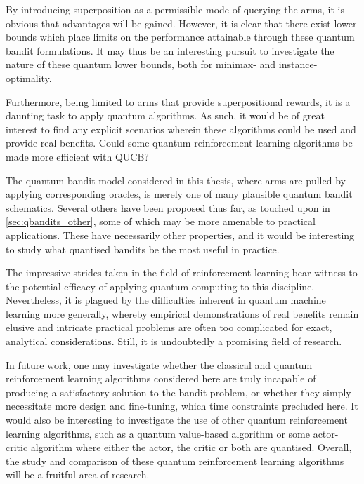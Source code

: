 By introducing superposition as a permissible mode of querying the arms, it is obvious that advantages will be gained.
However, it is clear that there exist lower bounds which place limits on the performance attainable through these quantum bandit formulations.
It may thus be an interesting pursuit to investigate the nature of these quantum lower bounds, both for minimax- and instance-optimality.

Furthermore, being limited to arms that provide superpositional rewards, it is a daunting task to apply quantum algorithms.
As such, it would be of great interest to find any explicit scenarios wherein these algorithms could be used and provide real benefits.
Could some quantum reinforcement learning algorithms be made more efficient with QUCB?

The quantum bandit model considered in this thesis, where arms are pulled by applying corresponding oracles, is merely one of many plausible quantum bandit schematics.
Several others have been proposed thus far, as touched upon in \cref{sec:qbandits_other}, some of which may be more amenable to practical applications.
These have necessarily other properties, and it would be interesting to study what quantised bandits be the most useful in practice.

The impressive strides taken in the field of reinforcement learning bear witness to the potential efficacy of applying quantum computing to this discipline.
Nevertheless, it is plagued by the difficulties inherent in quantum machine learning more generally, whereby empirical demonstrations of real benefits remain elusive and intricate practical problems are often too complicated for exact, analytical considerations.
Still, it is undoubtedly a promising field of research.

In future work, one may investigate whether the classical and quantum reinforcement learning algorithms considered here are truly incapable of producing a satisfactory solution to the bandit problem, or whether they simply necessitate more design and fine-tuning, which time constraints precluded here.
It would also be interesting to investigate the use of other quantum reinforcement learning algorithms, such as a quantum value-based algorithm or some actor-critic algorithm where either the actor, the critic or both are quantised.
Overall, the study and comparison of these quantum reinforcement learning algorithms will be a fruitful area of research.
